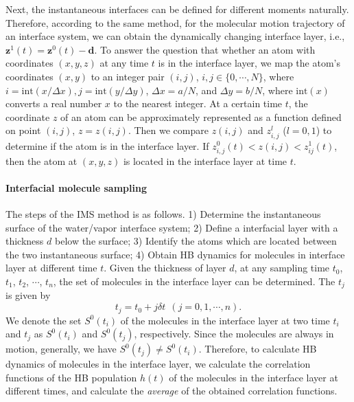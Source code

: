 Next, the instantaneous interfaces can be defined for different moments naturally. 
Therefore, according to the same method, for the molecular motion trajectory of an interface system, 
we can obtain the dynamically changing interface layer, i.e., ${\mathbf z}^1(t)={\mathbf z}^0(t)-{\mathbf d}$. 
To answer the question that whether an atom with coordinates $(x, y, z)$ at any time $t$ is in the interface layer,
we map the atom's coordinates $(x, y)$ to an integer pair $(i, j)$, $i,j \in  \{0,\cdots,N\}$, 
where $i = \text{int}(x /\Delta x), j = \text{int}(y/\Delta y)$, $\Delta x = a/N$, and $\Delta y = b/N$, 
where $\text{int}(x)$ converts a real number $x$ to the nearest integer.
At a certain time $t$, the coordinate $z$ of an atom can be approximately represented as a function defined on point $(i, j)$, $z=z(i,j)$. 
Then we compare $z(i,j)$ and $z^l_{i,j}$ ($l=0,1$) to determine if the atom is in the interface layer. 
If $z^0_{i,j}(t)<z(i,j)<z^1_{ij}(t)$, then the atom at $(x,y,z)$ is located in the interface layer at time $t$.

\paragraph{Interfacial molecule sampling}\label{para_MS_interface}
The steps of the IMS method is as follows. 
1) Determine the instantaneous surface of the water/vapor interface system;
2) Define a interfacial layer with a thickness $d$ below the surface; 
3) Identify the atoms which are located between the two instantaneous surface;
4) Obtain HB dynamics for molecules in interface layer at different time $t$.
Given the thickness of layer $d$, at any sampling time $t_0$, $t_1$, $t_2$, $\cdots$, $t_n$, the set of molecules in the interface layer can be determined.
The $t_j$ is given by 
\begin{equation}
t_j = t_0 + j{\delta} t \ \ (j=0,1,\cdots,n).
\end{equation}
We denote the set $S^0(t_i)$ of the molecules in the interface layer at two time $t_i$  and $t_j$ as $S^0(t_i)$ and $S^0(t_j)$, respectively.
Since the molecules are always in motion, generally, we have $S^0(t_j) \neq S^0(t_i)$. 
Therefore, to calculate HB dynamics of molecules in the interface layer, we calculate the correlation functions of 
the HB population $h(t)$ of the molecules in the interface layer at different times, 
and calculate the \emph{average} of the obtained correlation functions. 
 
